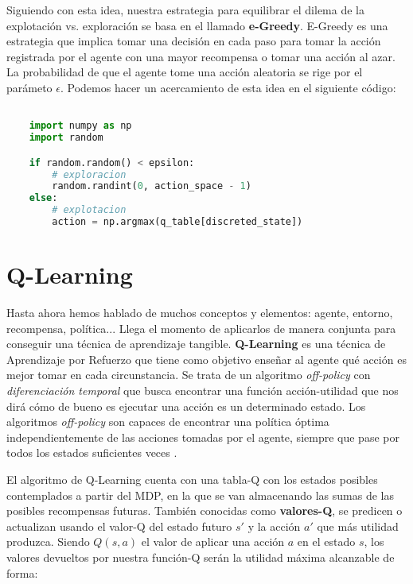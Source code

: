 Siguiendo con esta idea, nuestra estrategia para equilibrar el dilema de la explotación vs. exploración se basa en el llamado \textbf{e-Greedy}. E-Greedy es una estrategia que implica tomar una decisión en cada paso para tomar la acción registrada por el agente con una mayor recompensa o tomar una acción al azar. La probabilidad de que el agente tome una acción aleatoria se rige por el parámeto \( \epsilon \). Podemos hacer un acercamiento de esta idea en el siguiente código:

\begin{minipage}{0.9\linewidth}%
    \begin{lstlisting}[frame=tb, language=Python, caption=Pseudocódigo e-Greedy, label=code:e_greedy]

    import numpy as np
    import random

    if random.random() < epsilon:
        # exploracion
        random.randint(0, action_space - 1)
    else:
        # explotacion
        action = np.argmax(q_table[discreted_state])
    \end{lstlisting}%
\end{minipage}

\section{Q-Learning}

Hasta ahora hemos hablado de muchos conceptos y elementos: agente, entorno, recompensa, política... Llega el momento de aplicarlos de manera conjunta para conseguir una técnica de aprendizaje tangible. \textbf{Q-Learning} es una técnica de Aprendizaje por Refuerzo que tiene como objetivo enseñar al agente qué acción es mejor tomar en cada circunstancia. Se trata de un algoritmo \textit{off-policy} con \textit{diferenciación temporal} que busca encontrar una función acción-utilidad que nos dirá cómo de bueno es ejecutar una acción es un determinado estado. Los algoritmos \textit{off-policy} son capaces de encontrar una política óptima independientemente de las acciones tomadas por el agente, siempre que pase por todos los estados suficientes veces \citep{PooleMackworth17}.

El algoritmo de Q-Learning cuenta con una tabla-Q con los estados posibles contemplados a partir del MDP, en la que se van almacenando las sumas de las posibles recompensas futuras. También conocidas como \textbf{valores-Q}, se predicen o actualizan usando el valor-Q del estado futuro $s'$ y la acción $a'$ que más utilidad produzca. Siendo $Q(s, a)$ el valor de aplicar una acción $a$ en el estado $s$, los valores devueltos por nuestra función-Q serán la utilidad máxima alcanzable de forma:

